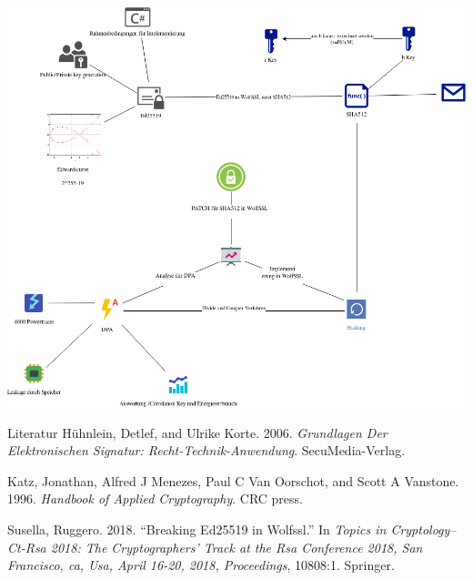 \documentclass[
  10pt,
  ignorenonframetext,
  aspectratio=169,
]{beamer}
\newlength{\cslhangindent}
\newenvironment{cslreferences}%
  {\setlength{\parindent}{0pt}%
  \everypar{\setlength{\hangindent}{\cslhangindent}}\ignorespaces}%
  {\par}
\begin{document}
\begin{frame}{}
\protect\hypertarget{section-25}{}
\includegraphics{Abbildungen/ITSEC(1).png}
\end{frame}

\begin{frame}{Literatur}
\protect\hypertarget{literatur}{}
\hypertarget{refs}{}
\begin{cslreferences}
\leavevmode\hypertarget{ref-huhnlein2006grundlagen}{}%
Hühnlein, Detlef, and Ulrike Korte. 2006. \emph{Grundlagen Der
Elektronischen Signatur: Recht-Technik-Anwendung}. SecuMedia-Verlag.

\leavevmode\hypertarget{ref-katz1996handbook}{}%
Katz, Jonathan, Alfred J Menezes, Paul C Van Oorschot, and Scott A
Vanstone. 1996. \emph{Handbook of Applied Cryptography}. CRC press.

\leavevmode\hypertarget{ref-susella2018breaking}{}%
Susella, Ruggero. 2018. ``Breaking Ed25519 in Wolfssl.'' In \emph{Topics
in Cryptology--Ct-Rsa 2018: The Cryptographers' Track at the Rsa
Conference 2018, San Francisco, ca, Usa, April 16-20, 2018,
Proceedings}, 10808:1. Springer.
\end{cslreferences}
\end{frame}
\end{document}
